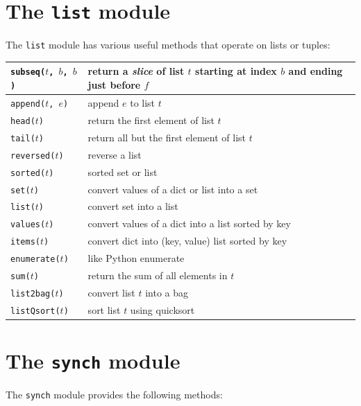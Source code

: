 \documentclass{report}
\begin{document}
\section{The \texttt{list} module}
\label{ap:list}

%
The \texttt{list} module has various useful methods that operate on lists
or tuples:

\vspace{1em}
\begin{tabular}{|l|l|}
\hline
\texttt{subseq($t$, $b$, $b$)} & return a \emph{slice} of list $t$ starting
at index $b$ and ending just before $f$\\
\hline
\texttt{append($t$, $e$)} & append $e$ to list $t$\\
\hline
\texttt{head($t$)} & return the first element of list $t$\\
\hline
\texttt{tail($t$)} & return all but the first element of list $t$\\
\hline
\texttt{reversed($t$)} & reverse a list \\
\hline
\texttt{sorted($t$)} & sorted set or list \\
\hline
\texttt{set($t$)} & convert values of a dict or list into a set \\
\hline
\texttt{list($t$)} & convert set into a list \\
\hline
\texttt{values($t$)} & convert values of a dict into a list sorted by key \\
\hline
\texttt{items($t$)} & convert dict into (key, value) list sorted by key \\
\hline
\texttt{enumerate($t$)} & like Python enumerate \\
\hline
\texttt{sum($t$)} & return the sum of all elements in $t$\\
\hline
\texttt{list2bag($t$)} & convert list $t$ into a bag \\
\hline
\texttt{listQsort($t$)} & sort list $t$ using quicksort\\
\hline
\end{tabular}

\section{The \texttt{synch} module}

%
The \texttt{synch} module provides the following methods:
\end{document}
